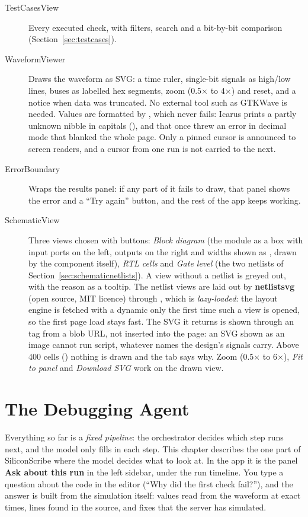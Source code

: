 \begin{description}
  \item[TestCasesView] Every executed check, with filters, search and a bit-by-bit comparison (Section~\ref{sec:testcases}).
  \item[WaveformViewer] Draws the waveform as SVG: a time ruler, single-bit signals as high/low lines, buses as labelled hex segments, zoom (0.5$\times$ to 4$\times$) and reset, and a notice when data was truncated. No external tool such as GTKWave is needed. Values are formatted by , which never fails: Icarus prints a partly unknown nibble in capitals (), and that once threw an error in decimal mode that blanked the whole page. Only a pinned cursor is announced to screen readers, and a cursor from one run is not carried to the next.
  \item[ErrorBoundary] Wraps the results panel: if any part of it fails to draw, that panel shows the error and a ``Try again'' button, and the rest of the app keeps working.
  \item[SchematicView] Three views chosen with buttons: \emph{Block diagram} (the module as a box with input ports on the left, outputs on the right and widths shown as \code{[n:0]}, drawn by the component itself), \emph{RTL cells} and \emph{Gate level} (the two netlists of Section~\ref{sec:schematicnetlists}). A view without a netlist is greyed out, with the reason as a tooltip. The netlist views are laid out by \textbf{netlistsvg} (open source, MIT licence) through , which is \emph{lazy-loaded}: the layout engine is fetched with a dynamic  only the first time such a view is opened, so the first page load stays fast. The SVG it returns is shown through an  tag from a blob URL, not inserted into the page: an SVG shown as an image cannot run script, whatever names the design's signals carry. Above 400 cells () nothing is drawn and the tab says why. Zoom (0.5$\times$ to 6$\times$), \emph{Fit to panel} and \emph{Download SVG} work on the drawn view.
\end{description}

\chapter{The Debugging Agent}
\label{ch:agent}

Everything so far is a \emph{fixed pipeline}: the orchestrator decides which step runs next, and the model only fills in each step. This chapter describes the one part of SiliconScribe where the model decides what to look at. In the app it is the panel \textbf{Ask about this run} in the left sidebar, under the run timeline. You type a question about the code in the editor (``Why did the first check fail?''), and the answer is built from the simulation itself: values read from the waveform at exact times, lines found in the source, and fixes that the server has simulated.

